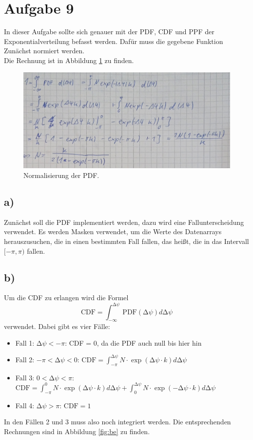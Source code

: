 \section{Aufgabe 9}

In dieser Aufgabe sollte sich genauer mit der PDF, CDF und PPF der Exponentialverteilung befasst werden. Dafür muss die gegebene Funktion Zunächst
normiert werden. \\
Die Rechnung ist in Abbildung \ref{fig:normalize} zu finden.

\begin{figure}
    \centering
    \includegraphics[width=\textwidth]{Norm.png}
    \caption{Normalisierung der PDF.}
    \label{fig:normalize}
\end{figure}
\FloatBarrier

\subsection{a)}
    Zunächst soll die PDF implementiert werden, dazu wird eine Fallunterscheidung verwendet. Es werden Masken verwendet,
    um die Werte des Datenarrays herauszusuchen, die in einen bestimmten Fall fallen, das heißt, die in das Intervall 
    $[-\pi, \pi)$ fallen.

\subsection{b)}
    Um die CDF zu erlangen wird die Formel
    \begin{equation*}
        \text{CDF} = \int_{-\infty}^{\increment \psi} \text{PDF}(\increment \psi) d\increment\psi 
    \end{equation*}
    verwendet. Dabei gibt es vier Fälle:
    \begin{itemize}
        \item Fall 1: $\increment\psi < -\pi$: CDF = 0, da die PDF auch null bis hier hin
        \item Fall 2: $-\pi < \increment \psi < 0$: $\text{CDF} = \int_{-\pi}^{\increment\psi} N \cdot \exp(\increment \psi \cdot k) d\increment\psi$
        \item Fall 3: $0 < \increment \psi < \pi$: $\text{CDF} = \int_{-\pi}^{0} N \cdot \exp(\increment \psi \cdot k) d\increment\psi + \int_{0}^{\increment\psi} N \cdot \exp(- \increment \psi \cdot k) d\increment\psi$
        \item Fall 4: $\increment \psi > \pi$: $\text{CDF} = 1$
    \end{itemize}
    In den Fällen 2 und 3 muss also noch integriert werden. Die entsprechenden Rechnungen sind in Abbildung \ref{fig:be} zu finden.
    
